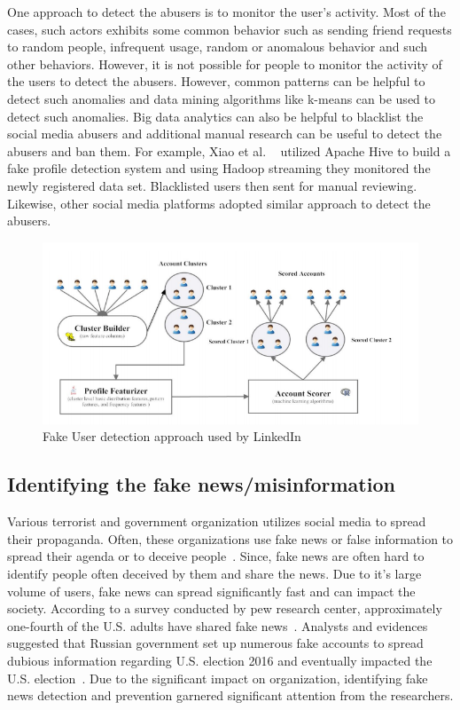 \documentclass[sigconf]{acmart}
\begin{document}
One approach to detect the abusers is to monitor the user's activity. Most of the cases, such actors exhibits some common behavior such as sending friend requests to random people, infrequent usage, random or anomalous behavior and such other behaviors. However, it is not possible for people to monitor the activity of the users to detect the abusers. However, common patterns can be helpful to detect such anomalies and data mining algorithms like k-means can be used to detect such anomalies. Big data analytics can also be helpful to blacklist the social media abusers and additional manual research can be useful to detect the abusers and ban them. For example, Xiao et al. ~\cite{Xiao:2015:DCF:2808769.2808779} utilized Apache Hive to build a fake profile detection system and using Hadoop streaming they monitored the newly registered data set. Blacklisted users then sent for manual reviewing. Likewise, other social media platforms adopted similar approach to detect the abusers. 

\begin{figure}[!ht]
 \centering\includegraphics[width=\columnwidth]{images/fakeuser.png}
  \caption{Fake User detection approach used by LinkedIn\cite{Xiao:2015:DCF:2808769.2808779}}
  \label{f:fake}
\end{figure}


\subsection{Identifying the fake news/misinformation }
Various terrorist and government organization utilizes social media to spread their propaganda. Often, these organizations use fake news or false information to spread their agenda or to deceive people~\cite{Aymanns:2017}.  Since, fake news are often hard to identify people often deceived by them and share the news. Due to it's large volume of users, fake news can spread significantly fast and can impact the society. According to a survey conducted by pew research center, approximately one-fourth of the U.S. adults have shared fake news~\cite{fake2}. Analysts and evidences suggested that Russian government  set up numerous fake accounts to spread dubious information regarding U.S. election 2016 and eventually impacted the U.S. election~\cite{fake2,Allcott:2017}.  Due to the significant impact on organization, identifying fake news detection and prevention garnered significant attention from  the researchers.
\end{document}
